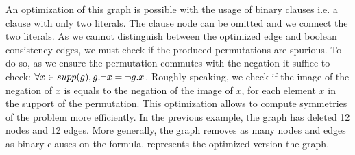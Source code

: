 %
%
%
%


An optimization of this graph is possible with the usage of binary clauses i.e. a clause with only two literals.
The clause node can be omitted and we connect the two literals. As we cannot distinguish between the optimized edge 
and boolean consistency edges, we must check if the produced permutations are spurious. 
To do so, as we ensure the permutation commutes with the negation it suffice to check:
$\forall x \in supp(g), g.\neg x = \neg g.x$.
Roughly speaking, we check if the image of the negation of $x$ is equals to the negation of the image of $x$,
for each element $x$ in the support of the permutation.
This optimization allows to compute symmetries of the problem more efficiently.
In the previous example, the graph has deleted 12 nodes and 12 edges. More generally,
the graph removes as many nodes and edges as binary clauses on the formula.
 represents the optimized version the graph.

